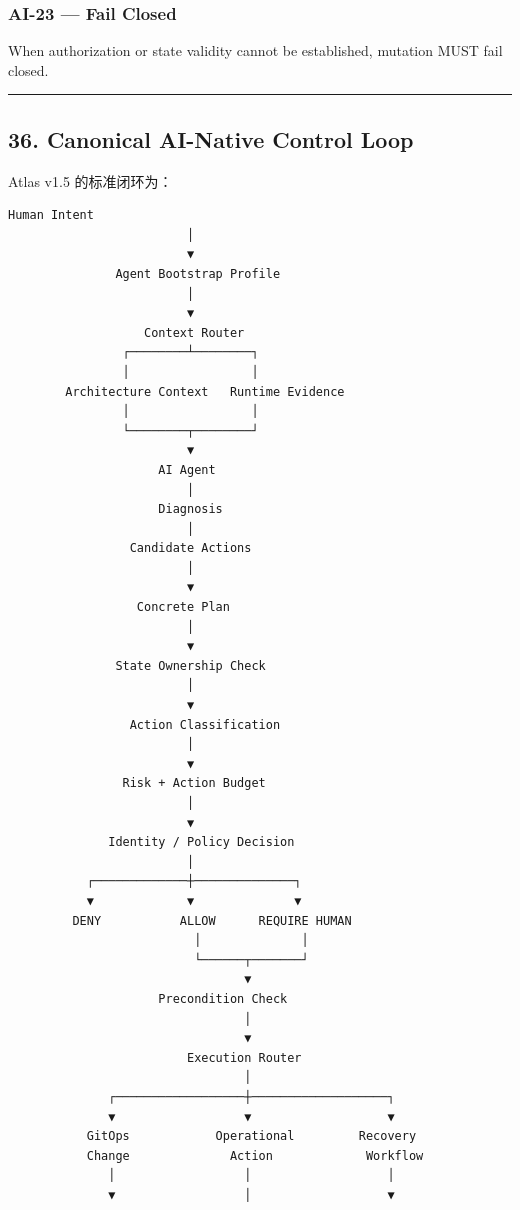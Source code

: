 \documentclass[11pt,a4paper]{article}
\begin{document}
\subsubsection{AI-23 — Fail Closed}
When authorization or state validity cannot be established, mutation MUST fail closed.

\vspace{0.5em}\hrule\vspace{0.5em}
\subsection{36. Canonical AI-Native Control Loop}
Atlas v1.5 的标准闭环为：

\begin{lstlisting}[language=text]
                    Human Intent
                         │
                         ▼
               Agent Bootstrap Profile
                         │
                         ▼
                   Context Router
                ┌────────┴────────┐
                │                 │
        Architecture Context   Runtime Evidence
                │                 │
                └────────┬────────┘
                         ▼
                     AI Agent
                         │
                     Diagnosis
                         │
                 Candidate Actions
                         │
                         ▼
                  Concrete Plan
                         │
                         ▼
               State Ownership Check
                         │
                         ▼
                 Action Classification
                         │
                         ▼
                Risk + Action Budget
                         │
                         ▼
              Identity / Policy Decision
                         │
           ┌─────────────┼──────────────┐
           ▼             ▼              ▼
         DENY           ALLOW      REQUIRE HUMAN
                          │              │
                          └──────┬───────┘
                                 ▼
                     Precondition Check
                                 │
                                 ▼
                         Execution Router
                                 │
              ┌──────────────────┼───────────────────┐
              ▼                  ▼                   ▼
           GitOps            Operational         Recovery
           Change              Action             Workflow
              │                  │                   │
              ▼                  │                   ▼

\end{lstlisting}
\end{document}
